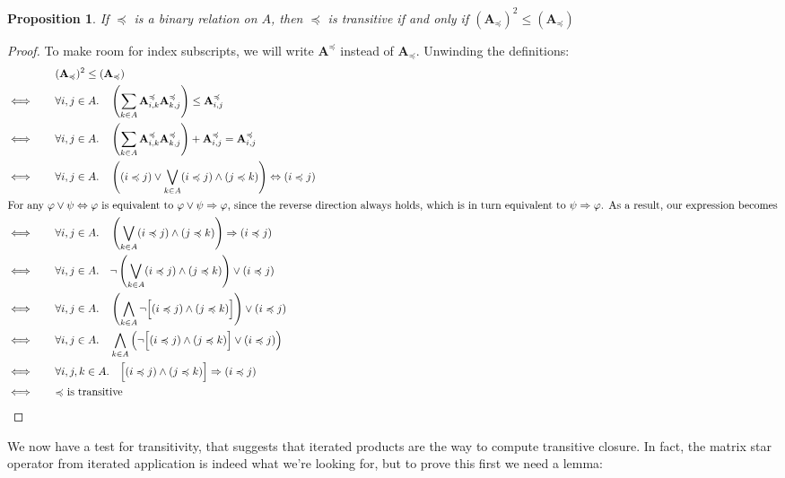 \documentclass{article}
\theoremstyle{plain}
\newtheorem{prop}[theorem]{Proposition}
\theoremstyle{definition}
\theoremstyle{remark}
\newcommand\leqc{\preccurlyeq}
\newcommand\mat[1]{\mathbf #1}
\begin{document}
	\begin{prop}
		If $\leqc$ is a binary relation on $A$, then $\leqc$ is transitive if and only if $(\mat A_{\leqc})^2 \leq (\mat A_\leqc)$
	\end{prop}
	\begin{proof} 
	To make room for index subscripts, we will write $\mat A^\leqc$ instead of $\mat A_\leqc$. Unwinding the definitions:	
	\begin{align*}
		&(\mat A_\leqc)^2 \leq (\mat A_\leqc)  \\
		\iff\qquad&\forall i,j \in A.\quad  \left(\sum_{k \in A} \mat A^\leqc_{i,k} \mat A^\leqc_{k,j}\right) \leq \mat A^\leqc_{i,j}   \\
		\iff\qquad &\forall i,j \in A.\quad  \left(\sum_{k \in A} \mat A^\leqc_{i,k} \mat A^\leqc_{k,j}\right)+ \mat A^\leqc_{i,j}  = \mat A^\leqc_{i,j}\\
		\iff\qquad &\forall i,j \in A.\quad \left( (i\leqc j) \lor \bigvee_{k \in A} (i \leqc j) \land (j \leqc k) \right) \Leftrightarrow (i \leqc j)\\
	\intertext{For any  $\varphi \lor \psi \Leftrightarrow \varphi$ is equivalent to $\varphi \lor \psi \Rightarrow \varphi$, since the reverse direction always holds, which is in turn equivalent to $\psi \Rightarrow \varphi$. As a result, our expression becomes}
		\iff\qquad &\forall i,j \in A.\quad  \left(\bigvee_{k \in A} (i \leqc j) \land (j \leqc k) \right) \Rightarrow (i \leqc j) \\
		\iff\qquad &\forall i,j \in A.\quad  \lnot \left(\bigvee_{k \in A} (i \leqc j) \land (j \leqc k) \right) \lor (i \leqc j) \\
		\iff\qquad &\forall i,j \in A.\quad  \left(\bigwedge_{k \in A} \lnot\Big[ (i \leqc j) \land (j \leqc k) \Big] \right) \lor (i \leqc j) \\
		\iff\qquad &\forall i,j \in A.\quad  \bigwedge_{k \in A}\left( \lnot\Big[ (i \leqc j) \land (j \leqc k) \Big]  \lor (i \leqc j) \right) \\
		\iff\qquad &\forall i,j,k \in A.\quad   \Big[ (i \leqc j) \land (j \leqc k) \Big]  \Rightarrow (i \leqc j) \\
		\iff\qquad & \text{$\leqc$ is transitive}
	\end{align*}
	\end{proof}

	We now have a test for transitivity, that suggests that iterated products are the way to compute transitive closure. In fact, the matrix star operator from iterated application is indeed what we're looking for, but to prove this first we need a lemma:
	
\end{document}
